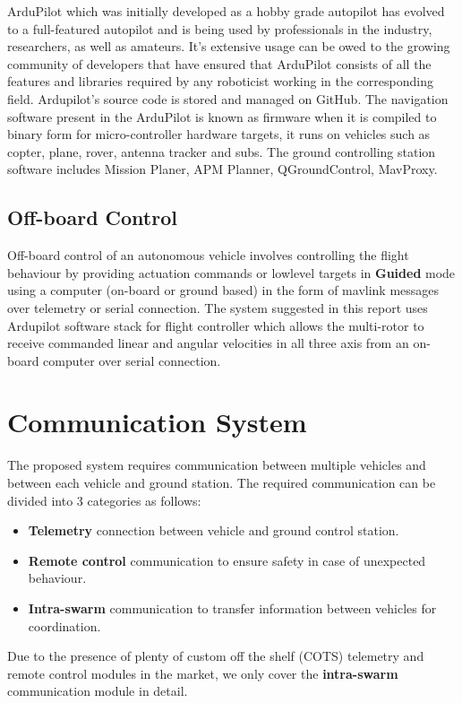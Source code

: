 \begin{spacing}{2}
ArduPilot which was initially developed as a hobby grade autopilot has evolved to a full-featured autopilot and is being used by professionals in the industry, researchers, as well as amateurs. It's extensive usage can be owed to the growing community of developers that have ensured that ArduPilot consists of all the features and libraries required by any roboticist working in the corresponding field. Ardupilot's source code is stored and managed on GitHub. The navigation software present in the ArduPilot is known as firmware when it is compiled to binary form for micro-controller hardware targets, it runs on vehicles such as copter, plane, rover, antenna tracker and subs. The ground controlling station software includes Mission Planer, APM Planner, QGroundControl, MavProxy.

\subsection{Off-board Control}
Off-board control of an autonomous vehicle involves controlling the flight behaviour by providing actuation commands or lowlevel targets in \textbf{Guided} mode using a computer (on-board or ground based) in the form of mavlink messages over telemetry or serial connection. The system suggested in this report uses Ardupilot software stack for flight controller which allows the multi-rotor to receive commanded linear and angular velocities in all three axis from an on-board computer over serial connection.

\section{Communication System}
The proposed system requires communication between multiple vehicles and between each vehicle and ground station. The required communication can be divided into 3 categories as follows:
\begin{itemize}
    \item \textbf{Telemetry} connection between vehicle and ground control station.
    \item \textbf{Remote control} communication to ensure safety in case of unexpected behaviour.
    \item \textbf{Intra-swarm} communication to transfer information between vehicles for coordination.
\end{itemize}

\noindent Due to the presence of plenty of custom off the shelf (COTS) telemetry and remote control modules in the market, we only cover the \textbf{intra-swarm} communication module in detail. 

\end{spacing}
